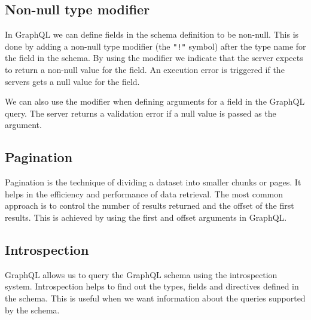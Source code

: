 \subsection{Non-null type modifier}
In GraphQL we can define fields in the schema definition to be non-null. This is done by adding a non-null type modifier (the \texttt{"!"} symbol) after the type name for the field in the schema. By using the modifier we indicate that the server expects to return a non-null value for the field. An execution error is triggered if the servers gets a null value for the field. 

We can also use the modifier when defining arguments for a field in the GraphQL query. The server returns a validation error if a null value is passed as the argument. 

\subsection{Pagination}
Pagination is the technique of dividing a dataset into smaller chunks or pages. It helps in the efficiency and performance of data retrieval. The most common approach is to control the number of results returned and the offset of the first results. This is achieved by using the first and offset arguments in GraphQL.

\subsection{Introspection}
GraphQL allows us to query the GraphQL schema using the introspection system. Introspection helps to find out the types, fields and directives defined in the schema. This is useful when we want information about the queries supported by the schema.

